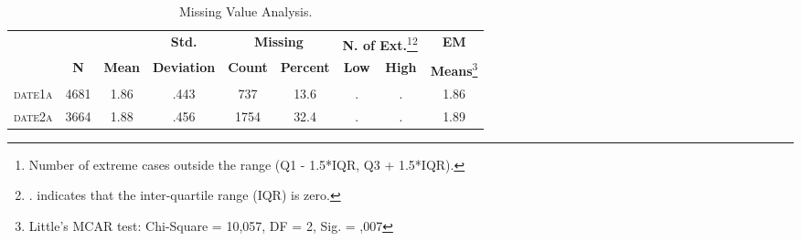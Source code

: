 \begin{table}[h]
\centering{}%
\begin{minipage}[t]{1\columnwidth}%
\begin{center}
\renewcommand{\arraystretch}{1.5}%
\begin{tabular}{ccccccccc}
\hline 
 &  &  & \textbf{Std. } & \multicolumn{2}{c}{\textbf{Missing}} & \multicolumn{2}{l}{\textbf{N. of Ext.}\footnote{Number of extreme cases outside the range (Q1 - 1.5{*}IQR, Q3 + 1.5{*}IQR). }\textbf{}\footnote{. indicates that the inter-quartile range (IQR) is zero.}} & \textbf{EM}\tabularnewline
 & \textbf{N} & \textbf{Mean} & \textbf{Deviation} & \textbf{Count} & \textbf{Percent} & \textbf{Low} & \textbf{High} & \textbf{Means}\footnote{Little's MCAR test: Chi-Square = 10,057, DF = 2, Sig. = ,007 }\tabularnewline
\hline 
\hline 
\textsc{date1a} & 4681 & 1.86 & .443 & 737 & 13.6 & . & . & 1.86\tabularnewline
\textsc{date2a} & 3664 & 1.88 & .456 & 1754 & 32.4 & . & . & 1.89\tabularnewline
\hline 
\end{tabular}\bigskip{}
\par\end{center}
\begin{center}
\caption{Missing Value Analysis.\label{tab:Missing-Value-Analysis}}
\par\end{center}%
\end{minipage}
\end{table}

